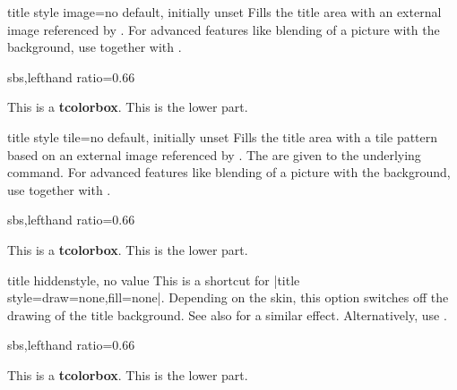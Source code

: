 \clearpage
\begin{docTcbKey}{title style image}{=}{no default, initially unset}
  Fills the title area with an external image referenced by .
  For advanced features like blending of a picture with the background,
  use  together with .

\begin{dispExample*}{sbs,lefthand ratio=0.66}

\begin{tcolorbox}[enhanced,title=My title,
  title style image=blueshade.png]
This is a \textbf{tcolorbox}.
\tcblower
This is the lower part.
\end{tcolorbox}
\end{dispExample*}
\end{docTcbKey}


\begin{docTcbKey}{title style tile}{=}{no default, initially unset}
  Fills the title area with a tile pattern based on an external image referenced by .
  The  are given to the underlying  command.
  For advanced features like blending of a picture with the background,
  use  together with .

\begin{dispExample*}{sbs,lefthand ratio=0.66}

\begin{tcolorbox}[enhanced,title=My title,
  title style tile={width=1cm}{pink_marble.png}]
This is a \textbf{tcolorbox}.
\tcblower
This is the lower part.
\end{tcolorbox}
\end{dispExample*}
\end{docTcbKey}


\begin{docTcbKey}{title hidden}{}{style, no value}
  This is a shortcut for |title style={draw=none,fill=none}|.
  Depending on the skin, this option switches off the drawing of the
  title background. See also  for a similar effect.
  Alternatively, use .
\begin{dispExample*}{sbs,lefthand ratio=0.66}

\begin{tcolorbox}[title=My title,
  enhanced,title hidden]
This is a \textbf{tcolorbox}.
\tcblower
This is the lower part.
\end{tcolorbox}
\end{dispExample*}
\end{docTcbKey}


